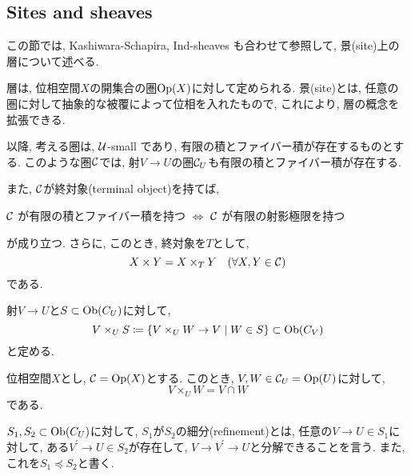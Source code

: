 \documentclass[../main]{subfiles}
\begin{document}
\setcounter{section}{1}
\setcounter{subsection}{1} \addtocounter{subsection}{-1}
\subsection{Sites and sheaves}
この節では,
Kashiwara-Schapira, Ind-sheaves \cite{book:KS_ind}
も合わせて参照して,
景(site)上の層について述べる.

\vspace{0.5em}
層は, 位相空間$X$の開集合の圏$\mathrm{Op}(X)$に対して定められる.
景(site)とは, 任意の圏に対して抽象的な被覆によって位相を入れたもので,
これにより, 層の概念を拡張できる.

以降, 考える圏は, $\mathcal{U}$-small であり,
有限の積とファイバー積が存在するものとする.
このような圏$\mathcal{C}$では,
射$V\to U$の圏$\mathcal{C}_U$も有限の積とファイバー積が存在する.

また, $\mathcal{C}$が終対象(terminal object)を持てば,
\begin{center}
  $\mathcal{C}$ が有限の積とファイバー積を持つ
  $\iff$
  $\mathcal{C}$ が有限の射影極限を持つ
\end{center}
が成り立つ.
さらに, このとき, 終対象を$T$として,
\[
  X\times Y = X\times_T Y \hspace{1em} (\forall X, Y\in \mathcal{C})
\]
である.

\begin{sym*}
  射$V\to U$と$S\subset \mathrm{Ob}(C_U)$に対して,
  \[
    V\times_U S
    \coloneqq
    \left\{
      V \times_U W \to V
      \mathrel{}\middle|\mathrel{}
      W\in S
      \right\} \subset \mathrm{Ob}(C_V)
  \]
  と定める.
\end{sym*}

\begin{rem*}
  位相空間$X$とし, $\mathcal{C} = \mathrm{Op}(X)$とする.
  このとき,
  $V,W\in\mathcal{C}_U = \mathrm{Op}(U)$に対して,
  \[
    V\times_U W = V\cap W
  \]
  である.
\end{rem*}

\begin{dfn}
  $S_1,S_2\subset \mathrm{Ob}(C_U)$に対して,
  $S_1$が$S_2$の細分(refinement)とは,
  任意の$V\to U \in S_1$に対して,
  ある$V^\prime\to U\in S_2$が存在して,
  $V\to V^\prime \to U$と分解できることを言う.
  また, これを$S_1 \preceq S_2$と書く.
\end{dfn}
\end{document}
